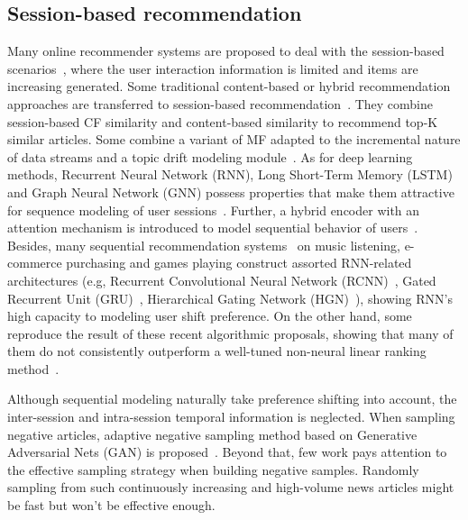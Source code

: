 \subsection{Session-based recommendation}
Many online recommender systems are proposed to deal with the session-based scenarios~\cite{epure_recommending_2017,zhou_variational_2019}, where the user interaction information is limited and items are increasing generated. Some traditional content-based or hybrid recommendation approaches are transferred to session-based recommendation~\cite{sottocornola2018session}.  They combine session-based CF similarity and content-based similarity to recommend top-K similar articles. Some combine a variant of MF adapted to the incremental nature of data streams and a topic drift modeling module~\cite{al2018adaptive}. As for deep learning methods, Recurrent Neural Network (RNN), Long Short-Term Memory (LSTM) and Graph Neural Network (GNN) possess properties that make them attractive for sequence modeling of user sessions~\cite{guo_streaming_2019,hidasi2015session,wang2019modeling,moreira_news_2018,wu2019session}. Further, a hybrid encoder with an attention mechanism is introduced to model sequential behavior of users~\cite{li2017neural,liu2018stamp,xu2019time,song_islf_2019,zhang_feature-level_2019}. 
Besides, many sequential recommendation systems~\cite{pereira2019online,xu2019graph} on music listening, e-commerce purchasing and games playing construct assorted RNN-related architectures (e.g, Recurrent Convolutional Neural Network (RCNN)~\cite{xu_recurrent_2019}, Gated Recurrent Unit (GRU)~\cite{hidasi2018recurrent}, Hierarchical Gating Network (HGN)~\cite{xiao2019hierarchical,ma2019hierarchical}), showing RNN's high capacity to modeling user shift preference. On the other hand, some reproduce the result of these recent algorithmic proposals, showing that many of them do not consistently outperform a well-tuned non-neural linear ranking method~\cite{dacrema_are_2019,ludewig_performance_2019}.

Although sequential modeling naturally take preference shifting into account, the inter-session and intra-session temporal information is neglected. When sampling negative articles, adaptive negative sampling method based on Generative Adversarial Nets (GAN) is proposed~\cite{wang_neural_2018}. Beyond that, few work pays attention to the effective sampling strategy when building negative samples. Randomly sampling from such continuously increasing and high-volume news articles might be fast but won't be effective enough.

